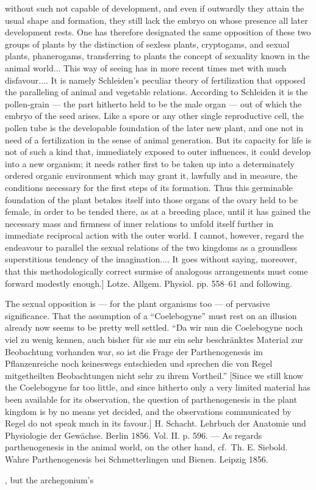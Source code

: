 \documentclass[12pt,a4paper]{book}
\begin{document}
{without such not capable of development, and even if outwardly they attain the
usual shape and formation, they still lack the embryo on whose presence all later
development rests. One has therefore designated the same opposition of these two
groups of plants by the distinction of sexless plants, cryptogams, and sexual
plants, phanerogams, transferring to plants the concept of sexuality known in the
animal world... This way of seeing has in more recent times met with much
disfavour.... It is namely Schleiden's peculiar theory of fertilization that
opposed the paralleling of animal and vegetable relations. According to Schleiden
it is the pollen-grain --- the part hitherto held to be the male organ --- out of
which the embryo of the seed arises. Like a spore or any other single reproductive
cell, the pollen tube is the developable foundation of the later new plant, and
one not in need of a fertilization in the sense of animal generation. But its
capacity for life is not of such a kind that, immediately exposed to outer
influences, it could develop into a new organism; it needs rather first to be
taken up into a determinately ordered organic environment which may grant it,
lawfully and in measure, the conditions necessary for the first steps of its
formation. Thus this germinable foundation of the plant betakes itself into those
organs of the ovary held to be female, in order to be tended there, as at a
breeding place, until it has gained the necessary mass and firmness of inner
relations to unfold itself further in immediate reciprocal action with the outer
world. I cannot, however, regard the endeavour to parallel the sexual relations of
the two kingdoms as a groundless superstitious tendency of the imagination.... It
goes without saying, moreover, that this methodologically correct surmise of
analogous arrangements must come forward modestly enough.] Lotze. Allgem. Physiol.
pp. 558--61 and following.

The sexual opposition is --- for the plant organisms too --- of pervasive
significance. That the assumption of a ``Coelebogyne'' must rest on an illusion
already now seems to be pretty well settled. ``Da wir nun die Coelebogyne noch
viel zu wenig kennen, auch bisher für sie nur ein sehr beschränktes Material zur
Beobachtung vorhanden war, so ist die Frage der Parthenogenesis im Pflanzenreiche
noch keineswegs entschieden und sprechen die von Regel mitgetheilten Beobachtungen
nicht sehr zu ihrem Vortheil.'' [Since we still know the Coelebogyne far too
little, and since hitherto only a very limited material has been available for its
observation, the question of parthenogenesis in the plant kingdom is by no means
yet decided, and the observations communicated by Regel do not speak much in its
favour.] H. Schacht. Lehrbuch der Anatomie und Physiologie der Gewächse. Berlin
1856. Vol. II. p. 596. --- As regards parthenogenesis in the animal world, on the
other hand, cf.\ Th. E. Siebold. Wahre Parthenogenesis bei Schmetterlingen und
Bienen. Leipzig 1856.}, but the archegonium's
\end{document}
